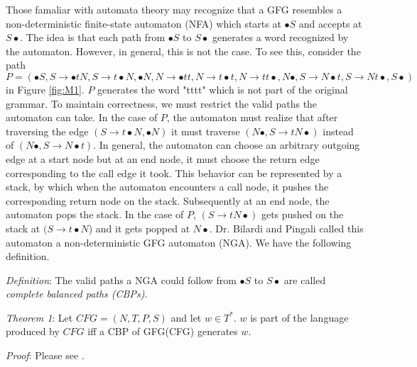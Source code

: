 \documentclass{sigplanconf}
\begin{document}
Those famaliar with automata theory may recognize that a GFG resembles a non-deterministic finite-state automaton (NFA) which starts at $\bullet{S}$ and accepts at $S\bullet$. The idea is that each path from $\bullet{S}$ to $S\bullet$ generates a word recognized by the automaton. However, in general, this is not the case. To see this, consider the path $P = (\bullet{S}, S\longrightarrow{\bullet{tN}}, S\longrightarrow{t\bullet{N}}, \bullet{N}, N\longrightarrow{\bullet{tt}}, N\longrightarrow{t\bullet{t}}, N\longrightarrow{tt\bullet}, N\bullet, S\longrightarrow{N\bullet{t}}, S\longrightarrow{Nt\bullet}, S\bullet)$ in Figure \ref{fig:M1}. $P$ generates the word "tttt" which is not part of the original grammar. To maintain correctness, we must restrict the valid paths the automaton can take. In the case of $P$, the automaton must realize that after traversing the edge $(S\longrightarrow{t\bullet{N}}, \bullet{N})$ it must traverse $(N\bullet, S\longrightarrow{tN\bullet})$ instead of $(N\bullet, S\longrightarrow{N\bullet{t}})$. In general, the automaton can choose an arbitrary outgoing edge at a start node but at an end node, it must choose the return edge corresponding to the call edge it took. This behavior can be represented by a stack, by which when the automaton encounters a call node, it pushes the corresponding return node on the stack. Subsequently at an end node, the automaton pops the stack. In the case of $P$, $(S\longrightarrow{tN\bullet})$ gets pushed on the stack at $(S\longrightarrow{t\bullet{N}}$) and it gets popped at $N\bullet$. Dr. Bilardi and Pingali called this automaton a non-deterministic GFG automaton (NGA). We have the following definition.

\textit{Definition}: The valid paths a NGA could follow from $\bullet{S}$ to $S\bullet$ are called \textit{complete balanced paths (CBPs)}.

\textit{Theorem 1}: Let $CFG = (N, T, P, S)$ and let $w\in{T^*}$. $w$ is part of the language produced by $CFG$ iff a CBP of GFG(CFG) generates $w$.

\textit{Proof}: Please see \cite{bilardi-pingali}.
\end{document}
